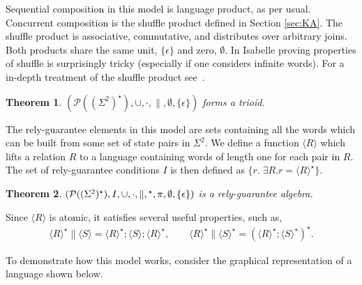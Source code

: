 \documentclass{llncs}
\newtheorem{thm}{Theorem}
\begin{document}
Sequential composition in this model is language product, as per
usual. Concurrent composition is the shuffle product defined in
Section \ref{sec:KA}. The shuffle product is associative, commutative,
and distributes over arbitrary joins. Both products share the same
unit, $\{\epsilon\}$ and zero, $\emptyset$. In Isabelle proving
properties of shuffle is surprisingly tricky (especially if one
considers infinite words). For a in-depth treatment of the shuffle
product see~\cite{mateescu_shuffle-like_1997}.

\begin{thm}
$(\mathcal{P}((\Sigma^2)^\star), \cup, \cdot,\|, \emptyset,
  \{\epsilon\})$ forms a trioid.
\end{thm}

The rely-guarantee elements in this model are sets containing all the
words which can be built from some set of state pairs in
$\Sigma^2$. We define a function $\langle R\rangle$ which
lifts a relation $R$ to a language containing words of length one for
each pair in $R$. The set of rely-guarantee conditions $I$ is then defined
as $\{r.\; \exists R. r = \langle R\rangle^\star\}$.

\begin{thm}
$(\mathcal{P}((\Sigma^2)^\star), I, \cup, \cdot,\|,
  \hphantom{}^\star,\pi,\emptyset, \{\epsilon\})$ is a rely-guarantee algebra.
\end{thm}
Since $\langle R\rangle$ is atomic, it satisfies several useful properties, such as,
\begin{align*}
\langle R\rangle^\star \| \langle S\rangle = \langle R\rangle^\star; \langle S\rangle; \langle R\rangle^\star,
\qquad \langle R\rangle^\star \| \langle S\rangle^\star = (\langle R\rangle^\star; \langle S\rangle^\star)^\star.
\end{align*}

To demonstrate how this model works, consider the graphical
representation of a language shown below.
\end{document}
